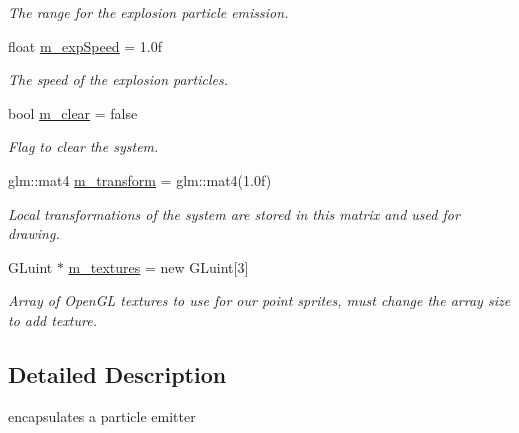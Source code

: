 \begin{DoxyCompactItemize}
\begin{DoxyCompactList}\small\item\em The range for the explosion particle emission. \end{DoxyCompactList}\item 
\hypertarget{classEmitter_aefb05cb4e4750257404580f0792679d2}{float \hyperlink{classEmitter_aefb05cb4e4750257404580f0792679d2}{m\-\_\-exp\-Speed} = 1.\-0f}\label{classEmitter_aefb05cb4e4750257404580f0792679d2}

\begin{DoxyCompactList}\small\item\em The speed of the explosion particles. \end{DoxyCompactList}\item 
\hypertarget{classEmitter_a60ab680e86688dd4f0f428b6d88f5f06}{bool \hyperlink{classEmitter_a60ab680e86688dd4f0f428b6d88f5f06}{m\-\_\-clear} = false}\label{classEmitter_a60ab680e86688dd4f0f428b6d88f5f06}

\begin{DoxyCompactList}\small\item\em Flag to clear the system. \end{DoxyCompactList}\item 
\hypertarget{classEmitter_a79ec38b927d82009c22199a4cbecfd85}{glm\-::mat4 \hyperlink{classEmitter_a79ec38b927d82009c22199a4cbecfd85}{m\-\_\-transform} = glm\-::mat4(1.\-0f)}\label{classEmitter_a79ec38b927d82009c22199a4cbecfd85}

\begin{DoxyCompactList}\small\item\em Local transformations of the system are stored in this matrix and used for drawing. \end{DoxyCompactList}\item 
\hypertarget{classEmitter_a4530f4a730e651511dfee30293e666ba}{G\-Luint $\ast$ \hyperlink{classEmitter_a4530f4a730e651511dfee30293e666ba}{m\-\_\-textures} = new G\-Luint\mbox{[}3\mbox{]}}\label{classEmitter_a4530f4a730e651511dfee30293e666ba}

\begin{DoxyCompactList}\small\item\em Array of Open\-G\-L textures to use for our point sprites, must change the array size to add texture. \end{DoxyCompactList}\end{DoxyCompactItemize}


\subsection{Detailed Description}
encapsulates a particle emitter 

